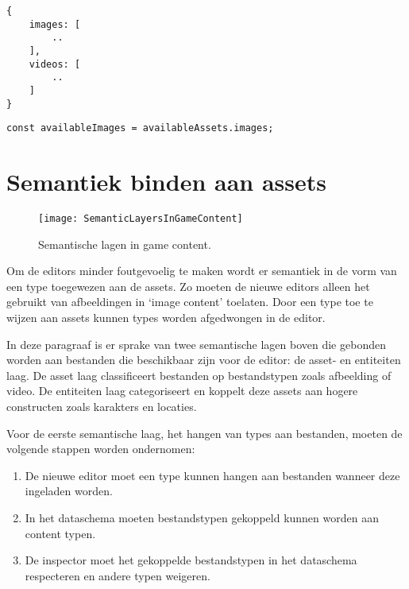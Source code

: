 \lstset{language=JavaScript}
\begin{lstlisting}[caption={Geoptimaliseerd formaat voor het beheren van assets.},captionpos=b,label={lst:optimizedmanageformat}]
{
    images: [
        ..
    ],
    videos: [
        ..
    ]
}
\end{lstlisting}

\lstset{language=JavaScript}
\begin{lstlisting}[caption={Het verkrijgen van alle beschikbare images door middel van een property lookup.},captionpos=b,label={lst:propertylookup}]
const availableImages = availableAssets.images;
\end{lstlisting}

\section{Semantiek binden aan assets}

\begin{wrapfigure}{r}{0.35\textwidth}
    \texttt{[image: SemanticLayersInGameContent]}
    \caption{Semantische lagen in game content.}
    \label{fig:semanticgamecontentlayers}
    \centering
\end{wrapfigure}

Om de editors minder foutgevoelig te maken wordt er semantiek in de vorm van een type toegewezen aan de assets. Zo moeten de nieuwe editors alleen het gebruikt van afbeeldingen in ‘image content’ toelaten. Door een type toe te wijzen aan assets kunnen types worden afgedwongen in de editor. 

In deze paragraaf is er sprake van twee semantische lagen boven die gebonden worden aan bestanden die beschikbaar zijn voor de editor: de asset- en entiteiten laag. De asset laag classificeert bestanden op bestandstypen zoals afbeelding of video. De entiteiten laag categoriseert en koppelt deze assets aan hogere constructen zoals karakters en locaties. 

Voor de eerste semantische laag, het hangen van types aan bestanden, moeten de volgende stappen worden ondernomen:

\begin{enumerate}
    \item De nieuwe editor moet een type kunnen hangen aan bestanden wanneer deze ingeladen worden.
    \item In het dataschema moeten bestandstypen gekoppeld kunnen worden aan content typen.
    \item De inspector moet het gekoppelde bestandstypen in het dataschema respecteren en andere typen weigeren.
\end{enumerate}

